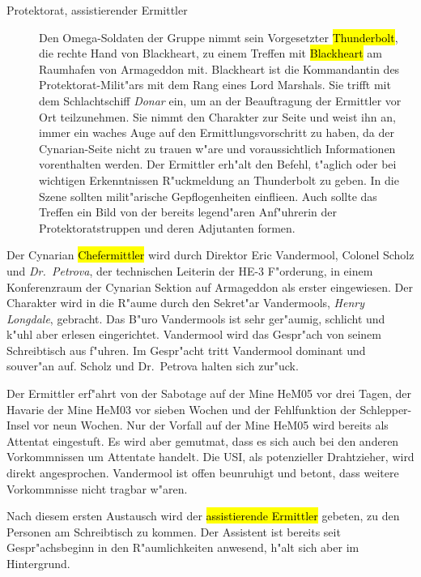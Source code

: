 \begin{description}
	\item [Protektorat, assistierender Ermittler] Den Omega-Soldaten der Gruppe nimmt sein Vorgesetzter \hl{Thunderbolt}, die rechte Hand 
		von Blackheart, zu einem Treffen mit \hl{Blackheart} am Raumhafen von Armageddon mit. Blackheart ist die Kommandantin des Protektorat-Milit"ars mit dem Rang eines Lord Marshals. Sie trifft mit dem Schlachtschiff \emph{Donar} ein, um an der Beauftragung der Ermittler vor Ort teilzunehmen. Sie nimmt den Charakter zur Seite und weist ihn an, immer ein waches Auge auf den Ermittlungsvorschritt zu haben, da der Cynarian-Seite nicht zu trauen w"are und voraussichtlich Informationen vorenthalten werden. Der Ermittler erh"alt den Befehl, t"aglich oder bei wichtigen Erkenntnissen R"uckmeldung an Thunderbolt zu geben. In die Szene sollten milit"arische Gepflogenheiten einflie\3en. Auch sollte das Treffen ein Bild von der bereits legend"aren Anf"uhrerin der Protektoratstruppen und deren Adjutanten formen. 
\end{description}


Der Cynarian \hl{Chefermittler} wird durch Direktor Eric Vandermool, Colonel Scholz und \emph{Dr.~Petrova}, der technischen Leiterin der HE-3 F"orderung, in einem Konferenzraum der Cynarian Sektion auf Armageddon als erster eingewiesen. Der Charakter wird in die R"aume durch den Sekret"ar Vandermools, \emph{Henry Longdale}, gebracht. Das B"uro Vandermools ist sehr ger"aumig, schlicht und k"uhl aber erlesen eingerichtet. Vandermool wird das Gespr"ach von seinem Schreibtisch aus f"uhren. Im Gespr"acht tritt Vandermool dominant und souver"an auf. Scholz und Dr.~Petrova halten sich zur"uck.

Der Ermittler erf"ahrt von der Sabotage auf der Mine HeM05 vor drei Tagen, der Havarie der Mine HeM03 vor sieben Wochen und der Fehlfunktion der Schlepper-Insel vor neun Wochen. Nur der Vorfall auf der Mine HeM05 wird bereits als Attentat eingestuft. Es wird aber gemutma\3t, dass es sich auch bei den anderen Vorkommnissen um Attentate handelt. Die USI, als potenzieller Drahtzieher, wird direkt angesprochen. Vandermool ist offen beunruhigt und betont, dass weitere Vorkommnisse nicht tragbar w"aren.

Nach diesem ersten Austausch wird der \hl{assistierende Ermittler} gebeten, zu den Personen am Schreibtisch zu kommen. Der Assistent ist bereits seit Gespr"achsbeginn in den R"aumlichkeiten anwesend, h"alt sich aber im Hintergrund.

